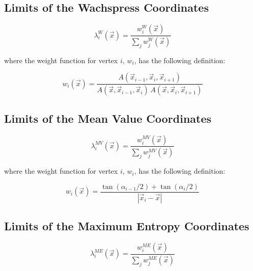 \subsection{Limits of the Wachspress Coordinates}
\label{sec::appendix_BF_Limits_Wachspress}

\begin{equation}
\label{eq::App_BF_WachBF}
\lambda_i^{W} (\vec{x}) = \frac{w_i^W  (\vec{x}) }{\sum_j w_j^W  (\vec{x}) }
\end{equation}

\noindent where the weight function for vertex $i$, $w_i$, has the following definition:

\begin{equation}
\label{eq::BF_wach_weights}
w_i (\vec{x})  = \frac{A(\vec{x}_{i-1}, \vec{x}_{i}, \vec{x}_{i+1})}{A(\vec{x}, \vec{x}_{i-1}, \vec{x}_{i}) \, A(\vec{x}, \vec{x}_{i}, \vec{x}_{i+1})}
\end{equation}

\subsection{Limits of the Mean Value Coordinates}
\label{sec::appendix_BF_Limits_MV}

\begin{equation}
\label{eq::App_BF_MVBF}
\lambda_i^{MV} (\vec{x}) = \frac{w_i^{MV}  (\vec{x}) }{\sum_j w_j^{MV}  (\vec{x}) }
\end{equation}

\noindent where the weight function for vertex $i$, $w_i$, has the following definition:

\begin{equation}
\label{eq::App_BF_MV_weights}
w_i (\vec{x})  = \frac{\tan(\alpha_{i-1} / 2) + \tan(\alpha_i / 2)}{|\vec{x}_i - \vec{x}|}
\end{equation}

\subsection{Limits of the Maximum Entropy Coordinates}
\label{sec::appendix_BF_Limits_ME}


\begin{equation}
\label{eq::App_BF_MEBF}
\lambda_i^{ME} (\vec{x}) = \frac{w_i^{ME}  (\vec{x}) }{\sum_j w_j^{ME}  (\vec{x}) }
\end{equation}

